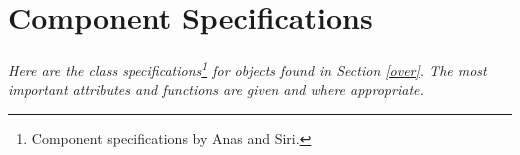 \documentclass[12pt]{article}
\begin{document}
%
%
%

\section{Component Specifications} \label{specs}
\paragraph{} \textit{Here are the class specifications\footnote{Component specifications by Anas and Siri.} for objects 
found in Section \ref{over}. The most important attributes and functions are given and where appropriate.}
\end{document}
